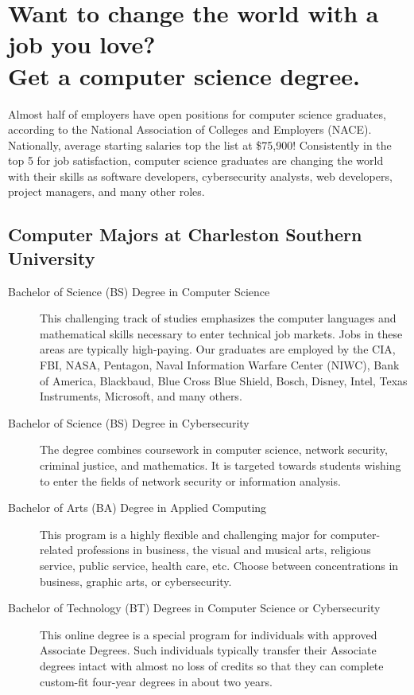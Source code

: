 %
\section*{Want to change the world with a job you love?\\
Get a computer science degree.}
Almost half of employers have open positions for computer science graduates, according to the National Association of Colleges and Employers (NACE). Nationally, average starting salaries top the list at \$75,900! Consistently in the top 5 for job satisfaction, computer science graduates are changing the world with their skills as software developers, cybersecurity analysts, web developers, project managers, and many other roles.


\subsection{Computer Majors at Charleston Southern University}
\begin{description}

	\item[Bachelor of Science (BS) Degree in Computer Science] This challenging track of studies emphasizes the computer languages and mathematical skills necessary to enter technical job markets. Jobs in these areas are typically high-paying. Our graduates are employed by the CIA, FBI, NASA, Pentagon, Naval Information Warfare Center (NIWC), Bank of America, Blackbaud, Blue Cross Blue Shield, Bosch, Disney, Intel, Texas Instruments, Microsoft, and many others.
	\item[Bachelor of Science (BS) Degree in Cybersecurity] The degree combines coursework in computer science, network security, criminal justice, and mathematics. It is targeted towards students wishing to enter the fields of network security or information analysis.
		\item[Bachelor of Arts (BA) Degree in Applied Computing] This program is a highly flexible and challenging major for computer-related professions in business, the visual and musical arts, religious service, public service, health care, etc. Choose between concentrations in business, graphic arts, or cybersecurity.
		\item[Bachelor of Technology (BT) Degrees in Computer Science or Cybersecurity] This online degree is a special program for individuals with approved Associate Degrees. Such individuals typically transfer their Associate degrees intact with almost no loss of credits so that they can complete custom-fit four-year degrees in about two years.\vspace{0.5em}
\end{description}

